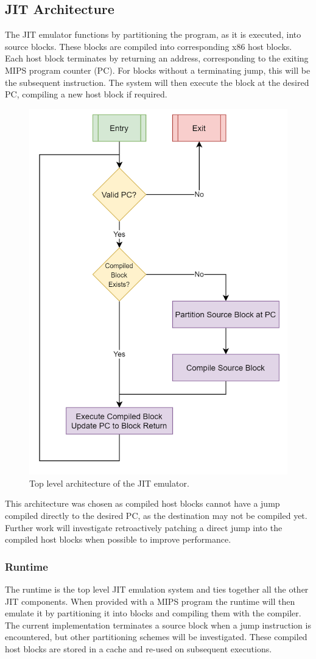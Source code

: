 \subsection{JIT Architecture}
\label{section:jit-arch}

The JIT emulator functions by partitioning the program, as it is executed, into source blocks. These blocks are compiled into corresponding x86 host blocks. Each host block terminates by returning an address, corresponding to the exiting MIPS program counter (PC). For blocks without a terminating jump, this will be the subsequent instruction. The system will then execute the block at the desired PC, compiling a new host block if required.

\begin{figure}[h]
    \centering
    \includegraphics[width=0.5\linewidth]{diagrams/jit.png}
    \caption{Top level architecture of the JIT emulator.}
    \label{figure:jit-arch}
\end{figure}

This architecture was chosen as compiled host blocks cannot have a jump compiled directly to the desired PC, as the destination may not be compiled yet. Further work will investigate retroactively patching a direct jump into the compiled host blocks when possible to improve performance.

\subsubsection{Runtime}

The runtime is the top level JIT emulation system and ties together all the other JIT components. When provided with a MIPS program the runtime will then emulate it by partitioning it into blocks and compiling them with the compiler. The current implementation terminates a source block when a jump instruction is encountered, but other partitioning schemes will be investigated. These compiled host blocks are stored in a cache and re-used on subsequent executions.

